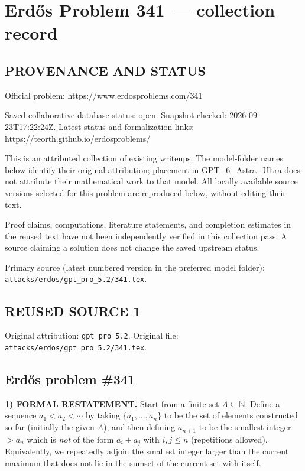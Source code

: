 \section*{Erd\H{o}s Problem 341 --- collection record}

\subsection*{PROVENANCE AND STATUS}
Official problem: https://www.erdosproblems.com/341

Saved collaborative-database status: open.
Snapshot checked: 2026-09-23T17:22:24Z.
Latest status and formalization links: https://teorth.github.io/erdosproblems/

This is an attributed collection of existing writeups. The model-folder names below identify their original attribution; placement in GPT\_6\_Astra\_Ultra does not attribute their mathematical work to that model. All locally available source versions selected for this problem are reproduced below, without editing their text.

Proof claims, computations, literature statements, and completion estimates in the reused text have not been independently verified in this collection pass. A source claiming a solution does not change the saved upstream status.

Primary source (latest numbered version in the preferred model folder): \texttt{attacks/erdos/gpt\_pro\_5.2/341.tex}.

\subsection*{REUSED SOURCE 1}
Original attribution: \texttt{gpt\_pro\_5.2}.
Original file: \texttt{attacks/erdos/gpt\_pro\_5.2/341.tex}.

\subsection*{Erd\H{o}s problem \#341}

\noindent\textbf{1) FORMAL RESTATEMENT.}
Start from a finite set $A\subseteq\mathbb{N}$. Define a sequence $a_1<a_2<\cdots$ by taking $\{a_1,\dots,a_n\}$ to be the set of elements constructed so far (initially the given $A$), and then defining $a_{n+1}$ to be the smallest integer $>a_n$ which is \emph{not} of the form $a_i+a_j$ with $i,j\le n$ (repetitions allowed).
Equivalently, we repeatedly adjoin the smallest integer larger than the current maximum that does not lie in the sumset of the current set with itself.

